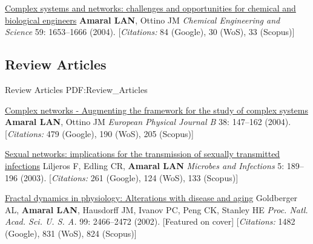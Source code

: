 \NumberedItem{\makebox[0.8cm][r]{[1]}}
\href{/people/amaral/complex-systems-and-networks-challenges-and-opportunities-for-chemical-and-biological-engineers}
{Complex systems and networks: challenges and opportunities for chemical and biological engineers}
\newline
{\textbf{Amaral LAN}}, Ottino JM
\newline
\textit{Chemical Engineering and Science}
    59:
1653--1666 (2004).
    [{\em{Citations:}} 84 (Google), 30 (WoS), 33 (Scopus)]
\newline
\Gap
~
\Gap

\vspace*{0.2cm}\subsection
{Review Articles}
{Review Articles}
{PDF:Review_Articles}

\GapNoBreak
\NumberedItem{\makebox[0.8cm][r]{[6]}}
\href{/people/amaral/complex-networks-augmenting-the-framework-for-the-study-of-complex-systems}
{Complex networks - Augmenting the framework for the study of complex systems}
\newline
{\textbf{Amaral LAN}}, Ottino JM
\newline
\textit{European Physical Journal B}
    38:
147--162 (2004).
    [{\em{Citations:}} 479 (Google), 190 (WoS), 205 (Scopus)]
\newline
\Gap
~
\Gap

\NumberedItem{\makebox[0.8cm][r]{[5]}}
\href{/people/amaral/sexual-networks-implications-for-the-transmission-of-sexually-transmitted-infections}
{Sexual networks: implications for the transmission of sexually transmitted infections}
\newline
Liljeros F, Edling CR, {\textbf{Amaral LAN}}
\newline
\textit{Microbes and Infections}
    5:
189--196 (2003).
    [{\em{Citations:}} 261 (Google), 124 (WoS), 133 (Scopus)]
\newline
\Gap
~
\Gap

\NumberedItem{\makebox[0.8cm][r]{[4]}}
\href{/people/amaral/fractal-dynamics-in-physiology-alterations-with-disease-and-aging}
{Fractal dynamics in physiology: Alterations with disease and aging}
\newline
Goldberger AL, {\textbf{Amaral LAN}}, Hausdorff JM, Ivanov PC, Peng CK, Stanley HE
\newline
\textit{Proc. Natl. Acad. Sci. U. S. A.}
    99:
2466--2472 (2002).
    [Featured on cover]
    [{\em{Citations:}} 1482 (Google), 831 (WoS), 824 (Scopus)]
\newline
\Gap
~
\Gap

